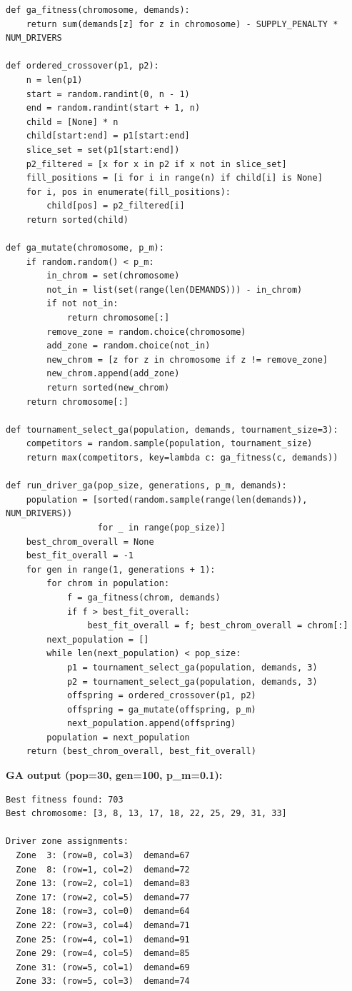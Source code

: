 \documentclass[12pt,a4paper]{article}
\begin{document}
\begin{lstlisting}[style=pycode, caption={Q6(c): GA for driver positioning}]
def ga_fitness(chromosome, demands):
    return sum(demands[z] for z in chromosome) - SUPPLY_PENALTY * NUM_DRIVERS

def ordered_crossover(p1, p2):
    n = len(p1)
    start = random.randint(0, n - 1)
    end = random.randint(start + 1, n)
    child = [None] * n
    child[start:end] = p1[start:end]
    slice_set = set(p1[start:end])
    p2_filtered = [x for x in p2 if x not in slice_set]
    fill_positions = [i for i in range(n) if child[i] is None]
    for i, pos in enumerate(fill_positions):
        child[pos] = p2_filtered[i]
    return sorted(child)

def ga_mutate(chromosome, p_m):
    if random.random() < p_m:
        in_chrom = set(chromosome)
        not_in = list(set(range(len(DEMANDS))) - in_chrom)
        if not not_in:
            return chromosome[:]
        remove_zone = random.choice(chromosome)
        add_zone = random.choice(not_in)
        new_chrom = [z for z in chromosome if z != remove_zone]
        new_chrom.append(add_zone)
        return sorted(new_chrom)
    return chromosome[:]

def tournament_select_ga(population, demands, tournament_size=3):
    competitors = random.sample(population, tournament_size)
    return max(competitors, key=lambda c: ga_fitness(c, demands))

def run_driver_ga(pop_size, generations, p_m, demands):
    population = [sorted(random.sample(range(len(demands)), NUM_DRIVERS))
                  for _ in range(pop_size)]
    best_chrom_overall = None
    best_fit_overall = -1
    for gen in range(1, generations + 1):
        for chrom in population:
            f = ga_fitness(chrom, demands)
            if f > best_fit_overall:
                best_fit_overall = f; best_chrom_overall = chrom[:]
        next_population = []
        while len(next_population) < pop_size:
            p1 = tournament_select_ga(population, demands, 3)
            p2 = tournament_select_ga(population, demands, 3)
            offspring = ordered_crossover(p1, p2)
            offspring = ga_mutate(offspring, p_m)
            next_population.append(offspring)
        population = next_population
    return (best_chrom_overall, best_fit_overall)
\end{lstlisting}

\textbf{GA output (pop=30, gen=100, p\_m=0.1):}

\begin{lstlisting}[style=output]
Best fitness found: 703
Best chromosome: [3, 8, 13, 17, 18, 22, 25, 29, 31, 33]

Driver zone assignments:
  Zone  3: (row=0, col=3)  demand=67
  Zone  8: (row=1, col=2)  demand=72
  Zone 13: (row=2, col=1)  demand=83
  Zone 17: (row=2, col=5)  demand=77
  Zone 18: (row=3, col=0)  demand=64
  Zone 22: (row=3, col=4)  demand=71
  Zone 25: (row=4, col=1)  demand=91
  Zone 29: (row=4, col=5)  demand=85
  Zone 31: (row=5, col=1)  demand=69
  Zone 33: (row=5, col=3)  demand=74
\end{lstlisting}
\end{document}
